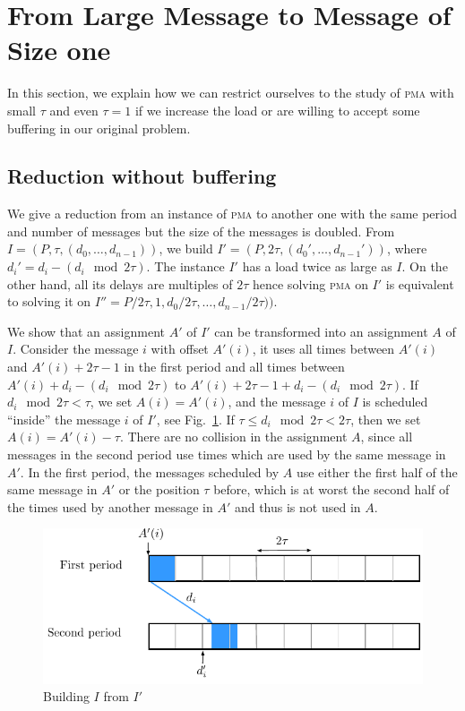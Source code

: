 \documentclass[a4paper,UKenglish,cleveref, autoref, thm-restate]{lipics-v2019}
\newcommand\pma{\textsc{pma}\xspace}
\begin{document}
 

\section{From Large Message to Message of Size one}\label{sec:reduction}

In this section, we explain how we can restrict ourselves to the study of \pma
with small $\tau$ and even $\tau = 1$ if we increase the load or are willing to accept some buffering in our original problem.


\subsection{Reduction without buffering}

We give a reduction from an instance of \pma to another one with the same period and number of messages but 
the size of the messages is doubled. From $I = (P,\tau,(d_{0},\dots,d_{n-1}))$, we build $I' = (P, 2\tau, (d_{0}',\dots,d_{n-1}'))$, where $d_i' = d_{i} - (d_{i} \mod 2\tau)$. The instance $I'$ has a load twice as large as $I$.
On the other hand, all its delays are multiples of $2\tau$ hence solving \pma on $I'$ is equivalent to solving it on $I'' = P/2\tau, 1,d_{0}/ 2\tau,\dots,d_{n-1} /2\tau))$. 

We show that an assignment $A'$ of $I'$ can be transformed into an assignment $A$ of $I$. 
Consider the message $i$ with offset $A'(i)$, it uses all times between $A'(i)$ and $A'(i) + 2\tau -1$ in the first period and all times between $A'(i) + d_{i} - (d_{i} \mod 2\tau)$ to $A'(i) + 2\tau -1+ d_{i} - (d_{i} \mod 2\tau)$. 
If $d_{i} \mod 2\tau < \tau $, we set $A(i) = A'(i)$, and the message $i$ of $I$ is scheduled ``inside'' the 
message $i$ of $I'$, see Fig.~\ref{fig:transf_2tau}. If $\tau \leq d_{i} \mod 2\tau < 2\tau$, then we set 
$A(i) = A'(i) - \tau$. There are no collision in the assignment $A$, since all messages in the second period use
times which are used by the same message in $A'$. In the first period, the messages scheduled by $A$ use either the first
half of the same message in $A'$ or the position $\tau$ before, which is at worst the second half of the times used by another message in $A'$ and thus is not used in $A$.

\begin{figure}[h]
\begin{center}

\includegraphics[scale=0.7]{transfo2tau}
\end{center}
\caption{Building $I$ from $I'$}
\label{fig:transf_2tau}
\end{figure}
\end{document}
